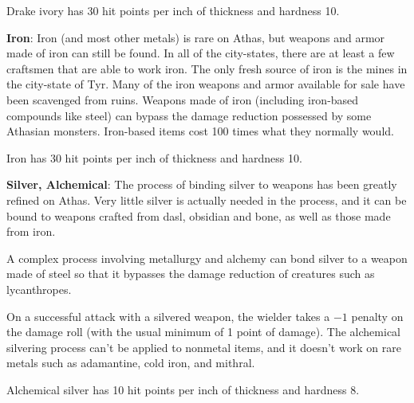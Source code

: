 Drake ivory has 30 hit points per inch of thickness and hardness 10.


\textbf{Iron}: Iron (and most other metals) is rare on Athas, but weapons and armor made of iron can still be found. In all of the city-states, there are at least a few craftsmen that are able to work iron. The only fresh source of iron is the mines in the city-state of Tyr. Many of the iron weapons and armor available for sale have been scavenged from ruins. Weapons made of iron (including iron-based compounds like steel) can bypass the damage reduction possessed by some Athasian monsters. Iron-based items cost 100 times what they normally would.

Iron has 30 hit points per inch of thickness and hardness 10.

\textbf{Silver, Alchemical}: The process of binding silver to weapons has been greatly refined on Athas. Very little silver is actually needed in the process, and it can be bound to weapons crafted from dasl, obsidian and bone, as well as those made from iron.

A complex process involving metallurgy and alchemy can bond silver to a weapon made of steel so that it bypasses the damage reduction of creatures such as lycanthropes.

On a successful attack with a silvered weapon, the wielder takes a $-1$ penalty on the damage roll (with the usual minimum of 1 point of damage). The alchemical silvering process can’t be applied to nonmetal items, and it doesn’t work on rare metals such as adamantine, cold iron, and mithral.

Alchemical silver has 10 hit points per inch of thickness and hardness 8.
